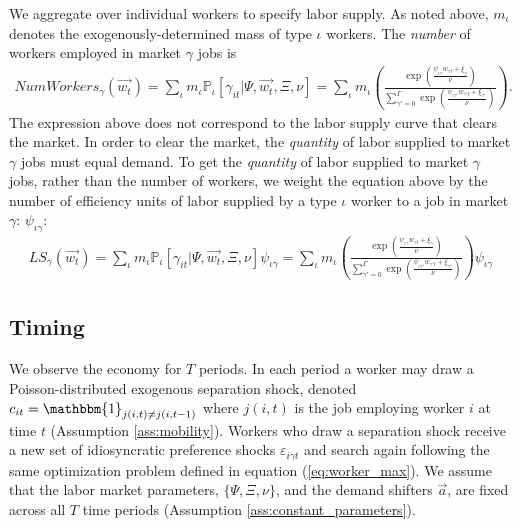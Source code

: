 \documentclass[12pt]{article}
\def\ig{\iota\gamma}
\def\g{\gamma}
\def\i{\iota}
\renewcommand{\P}{\mathbb {P}}
\theoremstyle{definition}
\theoremstyle{plain}
\def\ve{\varepsilon}
\begin{document}
We aggregate over individual workers to specify labor supply. As noted above, $m_{\i}$ denotes the exogenously-determined mass of type $\i$ workers. The \emph{number} of workers employed in market $\g$ jobs is 
\begin{align*}
NumWorkers_{\g}(\vec{w_t}) = \sum_{\i} m_{\i} \P_{\i}[\g_{it}|\Psi,\vec{w_t},\Xi,\nu] = \sum_{\i} m_{\i} \left( \frac{\exp \left( \frac{\psi_{\ig} w_{\g t} + \xi_{\g}}{\nu} \right) }{ \sum\limits_{\g'=0}^{\Gamma} \exp \left( \frac{\psi_{\ig'} w_{\g' t} + \xi_{\g'}}{\nu} \right) } \right). 
\end{align*}
The expression above does not correspond to the labor supply curve that clears the market. In order to clear the market, the \emph{quantity} of  labor supplied to market $\g$ jobs must equal demand. To get the \emph{quantity} of labor supplied to market $\g$ jobs, rather than the number of workers, we weight the equation above by the number of efficiency units of labor supplied by a type $\i$ worker to a job in market $\g$: $\psi_{\ig}$:
\begin{align}
LS_{\g}(\vec{w_t}) = \sum_{\i} m_{\i} \P_{\i}[\g_{it}|\Psi,\vec{w_t},\Xi,\nu] \psi_{\ig} = \sum_{\i} m_{\i} \left( \frac{\exp \left( \frac{\psi_{\ig} w_{\g t} + \xi_{\g}}{\nu} \right) }{ \sum\limits_{\g'=0}^{\Gamma} \exp \left( \frac{\psi_{\ig'} w_{\g' t} + \xi_{\g'}}{\nu} \right) } \right) \psi_{\ig} \label{eq:labor_supply}
\end{align}%


\subsection{Timing}

We observe the economy for $T$ periods.  In each period a worker may draw a Poisson-distributed exogenous separation shock, denoted $c_{it} = \mathbbm{1}_{j(i,t)\neq j(i,t-1)}$ where $j(i,t)$ is the job employing worker $i$ at time $t$ (Assumption \ref{ass:mobility}). Workers who draw a separation shock receive a new set of idiosyncratic preference shocks $\ve_{i\g t}$ and search again following the same optimization problem defined in equation (\ref{eq:worker_max}). We assume that the labor market parameters, $\{\Psi, \Xi, \nu\}$, and the demand shifters $\vec{a}$, are fixed across all $T$ time periods (Assumption \ref{ass:constant_parameters}).
\end{document}
